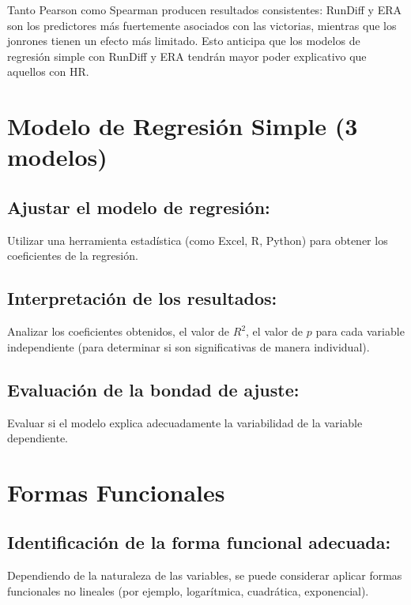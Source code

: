 \documentclass[10pt]{article}
\begin{document}
Tanto Pearson como Spearman producen resultados consistentes: RunDiff y ERA son los predictores más fuertemente asociados con las victorias, mientras que los jonrones tienen un efecto más limitado. Esto anticipa que los modelos de regresión simple con RunDiff y ERA tendrán mayor poder explicativo que aquellos con HR.
\section{Modelo de Regresión Simple (3 modelos)}
\subsection{Ajustar el modelo de regresión:}
Utilizar una herramienta estadística (como Excel, R, Python) para obtener los coeficientes de la regresión.

\subsection{Interpretación de los resultados:}
Analizar los coeficientes obtenidos, el valor de \(R^2\), el valor de \(p\) para cada variable independiente (para determinar si son significativas de manera individual).

\subsection{Evaluación de la bondad de ajuste:}
Evaluar si el modelo explica adecuadamente la variabilidad de la variable dependiente.
\section{Formas Funcionales}
\subsection{Identificación de la forma funcional adecuada:}
Dependiendo de la naturaleza de las variables, se puede considerar aplicar formas funcionales no lineales (por ejemplo, logarítmica, cuadrática, exponencial).
\end{document}
